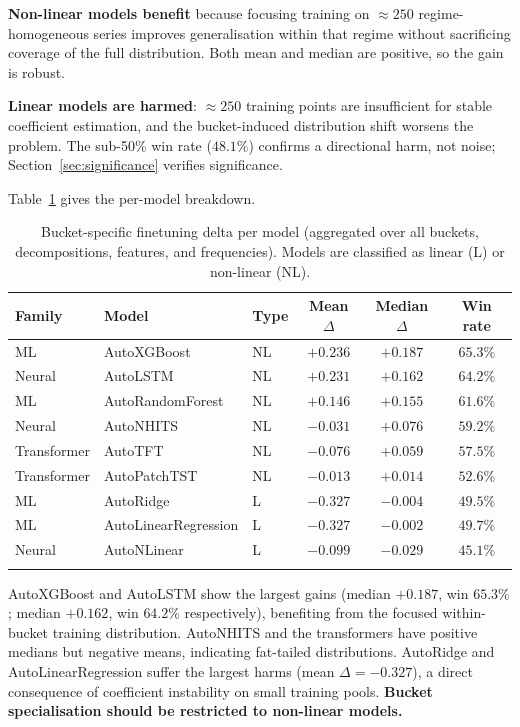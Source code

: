 \documentclass[pdflatex,sn-mathphys-num]{sn-jnl}
\theoremstyle{thmstyleone}
\theoremstyle{thmstyletwo}
\theoremstyle{thmstylethree}
\begin{document}
\noindent
\textbf{Non-linear models benefit} because focusing training on $\approx\!250$
regime-homogeneous series improves generalisation within that regime without
sacrificing coverage of the full distribution.
Both mean and median are positive, so the gain is robust.

\noindent
\textbf{Linear models are harmed}: $\approx\!250$ training points are
insufficient for stable coefficient estimation, and the bucket-induced
distribution shift worsens the problem.
The sub-50\% win rate ($48.1\%$) confirms a directional harm, not noise;
Section~\ref{sec:significance} verifies significance.

Table~\ref{tab:per_model} gives the per-model breakdown.

\begin{table}[ht]
\caption{Bucket-specific finetuning delta per model (aggregated over all
buckets, decompositions, features, and frequencies).
Models are classified as linear (L) or non-linear (NL).}\label{tab:per_model}
\begin{tabular*}{\textwidth}{@{\extracolsep\fill}lllccc}
\toprule
Family & Model & Type & Mean $\Delta$ & Median $\Delta$ & Win rate \\
\midrule
ML          & AutoXGBoost           & NL & $+0.236$ & $+0.187$ & $65.3\%$ \\
Neural      & AutoLSTM              & NL & $+0.231$ & $+0.162$ & $64.2\%$ \\
ML          & AutoRandomForest      & NL & $+0.146$ & $+0.155$ & $61.6\%$ \\
Neural      & AutoNHITS             & NL & $-0.031$ & $+0.076$ & $59.2\%$ \\
Transformer & AutoTFT               & NL & $-0.076$ & $+0.059$ & $57.5\%$ \\
Transformer & AutoPatchTST          & NL & $-0.013$ & $+0.014$ & $52.6\%$ \\
\midrule
ML          & AutoRidge             & L  & $-0.327$ & $-0.004$ & $49.5\%$ \\
ML          & AutoLinearRegression  & L  & $-0.327$ & $-0.002$ & $49.7\%$ \\
Neural      & AutoNLinear           & L  & $-0.099$ & $-0.029$ & $45.1\%$ \\
\botrule
\end{tabular*}
\end{table}

\noindent
AutoXGBoost and AutoLSTM show the largest gains (median $+0.187$,
win $65.3\%$; median $+0.162$, win $64.2\%$ respectively), benefiting from
the focused within-bucket training distribution.
AutoNHITS and the transformers have positive medians but negative means,
indicating fat-tailed distributions.
AutoRidge and AutoLinearRegression suffer the largest harms (mean $\Delta =
-0.327$), a direct consequence of coefficient instability on small training
pools.
\textbf{Bucket specialisation should be restricted to non-linear models.}
\end{document}
